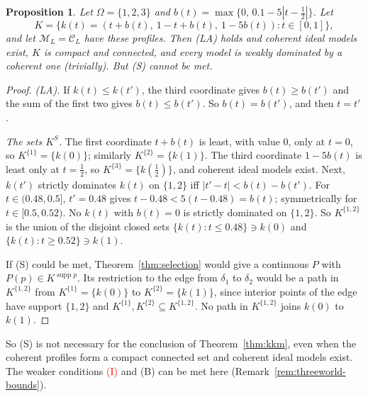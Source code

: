 \documentclass[11pt]{article}
\newtheorem{proposition}[theorem]{Proposition}
\theoremstyle{definition}
\theoremstyle{remark}
\newcommand{\M}{\mathcal M}
\newcommand{\C}{\mathcal C}
\newcommand{\supp}{\operatorname{supp}}
\begin{document}
\begin{proposition}\label{prop:threeworld}
Let $\Omega=\{1,2,3\}$ and $b(t)=\max\{0,\,0.1-5|t-\tfrac12|\}$. Let
\[
 K=\{k(t)=(t+b(t),\ 1-t+b(t),\ 1-5b(t)):t\in[0,1]\},
\]
and let $\M_L=\C_L$ have these profiles. Then (LA) holds and coherent ideal models exist, $K$ is compact and connected, and every model is weakly dominated by a coherent one (trivially). But (S) cannot be met.
\end{proposition}
\begin{proof}
\emph{(LA).} If $k(t)\le k(t')$, the third coordinate gives $b(t)\ge b(t')$ and the sum of the first two gives $b(t)\le b(t')$. So $b(t)=b(t')$, and then $t=t'$.

\emph{The sets $K^S$.} The first coordinate $t+b(t)$ is least, with value $0$, only at $t=0$, so $K^{\{1\}}=\{k(0)\}$; similarly $K^{\{2\}}=\{k(1)\}$. The third coordinate $1-5b(t)$ is least only at $t=\tfrac12$, so $K^{\{3\}}=\{k(\tfrac12)\}$, and coherent ideal models exist. Next, $k(t')$ strictly dominates $k(t)$ on $\{1,2\}$ iff $|t'-t|<b(t)-b(t')$. For $t\in(0.48,0.5]$, $t'=0.48$ gives $t-0.48<5(t-0.48)=b(t)$; symmetrically for $t\in[0.5,0.52)$. No $k(t)$ with $b(t)=0$ is strictly dominated on $\{1,2\}$. So $K^{\{1,2\}}$ is the union of the disjoint closed sets $\{k(t):t\le0.48\}\ni k(0)$ and $\{k(t):t\ge0.52\}\ni k(1)$.

If (S) could be met, Theorem~\ref{thm:selection} would give a continuous $P$ with $P(p)\in K^{\supp p}$. Its restriction to the edge from $\delta_1$ to $\delta_2$ would be a path in $K^{\{1,2\}}$ from $K^{\{1\}}=\{k(0)\}$ to $K^{\{2\}}=\{k(1)\}$, since interior points of the edge have support $\{1,2\}$ and $K^{\{1\}},K^{\{2\}}\subseteq K^{\{1,2\}}$. No path in $K^{\{1,2\}}$ joins $k(0)$ to $k(1)$.
\end{proof}
So (S) is not necessary for the conclusion of Theorem~\ref{thm:kkm}, even when the coherent profiles form a compact connected set and coherent ideal models exist. The weaker conditions \textcolor{red}{(I)} and (B) can be met here (Remark~\ref{rem:threeworld-bounds}).
\end{document}
